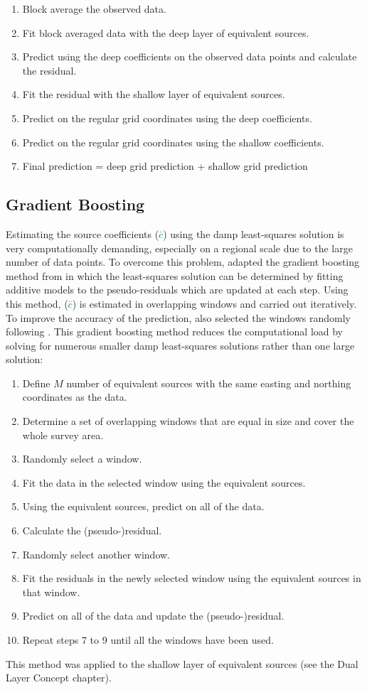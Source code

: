 \begin{enumerate}
    \item Block average the observed data.
    \item Fit block averaged data with the deep layer of equivalent sources.
    \item Predict using the deep coefficients on the observed data points and calculate the residual.
    \item Fit the residual with the shallow layer of equivalent sources.
    \item Predict on the regular grid coordinates using the deep coefficients.
    \item Predict on the regular grid coordinates using the shallow coefficients.
    \item Final prediction = deep grid prediction + shallow grid prediction
\end{enumerate}

\subsection{Gradient Boosting}
Estimating the source coefficients (\textcolor{teal}{$\bar{c}$}) using the damp least-squares solution is very computationally demanding, especially on a regional scale due to the large number of data points. To overcome this problem, \citet{SolerUieda2021} adapted the gradient boosting method from \citet{Friedman2001} in which the least-squares solution can be determined by fitting additive models to the pseudo-residuals which are updated at each step. Using this method, (\textcolor{teal}{$\bar{c}$}) is estimated in overlapping windows and carried out iteratively. To improve the accuracy of the prediction, \citet{SolerUieda2021} also selected the windows randomly following \citet{Friedman2002}. This gradient boosting method reduces the computational load by solving for numerous smaller damp least-squares solutions rather than one large solution:
\begin{enumerate}
    \item Define $M$ number of equivalent sources with the same easting and northing coordinates as the data.
    \item Determine a set of overlapping windows that are equal in size and cover the whole survey area.
    \item Randomly select a window.
    \item Fit the data in the selected window using the equivalent sources.
    \item Using the equivalent sources, predict on all of the data.
    \item Calculate the (pseudo-)residual.
    \item Randomly select another window.
    \item Fit the residuals in the newly selected window using the equivalent sources in that window.
    \item Predict on all of the data and update the (pseudo-)residual.
    \item Repeat steps 7 to 9 until all the windows have been used.
\end{enumerate}
This method was applied to the shallow layer of equivalent sources (see the Dual Layer Concept chapter).

